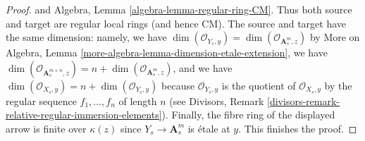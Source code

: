 \begin{proof}
and Algebra, Lemma \ref{algebra-lemma-regular-ring-CM}.
Thus both source and target are regular local rings (and hence CM).
The source and target have the same dimension: namely, we have
$\dim(\mathcal{O}_{Y_s, y}) = \dim(\mathcal{O}_{\mathbf{A}^m_s, z})$
by More on Algebra, Lemma \ref{more-algebra-lemma-dimension-etale-extension},
we have $\dim(\mathcal{O}_{\mathbf{A}^{m + n}_s, z}) = n +
\dim(\mathcal{O}_{\mathbf{A}^m_s, z})$, and we have
$\dim(\mathcal{O}_{X_s, y}) = n + \dim(\mathcal{O}_{Y_s, y})$
because $\mathcal{O}_{Y_s, y}$ is the quotient of
$\mathcal{O}_{X_s, y}$ by the regular sequence $f_1, \ldots, f_n$
of length $n$ (see
Divisors, Remark \ref{divisors-remark-relative-regular-immersion-elements}).
Finally, the fibre ring of the displayed arrow is finite over $\kappa(z)$
since $Y_s \to \mathbf{A}^m_s$ is \'etale at $y$.
This finishes the proof.
\end{proof}